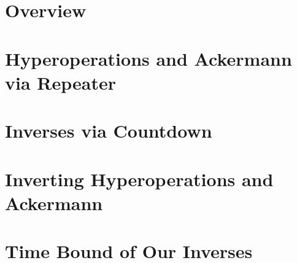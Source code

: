 \documentclass[sigplan,screen]{acmart}
\begin{document}
\maketitle


%



\section{Overview}
\label{sec: overview}


\section{Hyperoperations and Ackermann via Repeater}
\label{sec: countdown-repeater}


\section{Inverses via Countdown}
\label{sec: countdown}


\section{Inverting Hyperoperations and Ackermann}
\label{sec: inv-hyperop}


\section{Time Bound of Our Inverses}
\label{sec: inv-ack}

\end{document}
